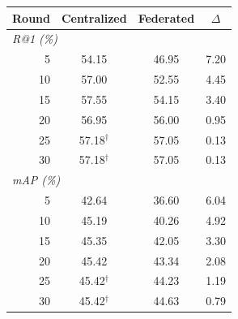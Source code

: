 \begin{tabular}{r cc c}
\toprule
Round & Centralized & Federated & $\Delta$\\
\midrule
\multicolumn{4}{l}{\textit{R@1 (\%)}}\\
5 & 54.15 & 46.95 & 7.20\\
10 & 57.00 & 52.55 & 4.45\\
15 & 57.55 & 54.15 & 3.40\\
20 & 56.95 & 56.00 & 0.95\\
25 & 57.18$^\dagger$ & 57.05 & 0.13\\
30 & 57.18$^\dagger$ & 57.05 & 0.13\\
\midrule
\multicolumn{4}{l}{\textit{mAP (\%)}}\\
5 & 42.64 & 36.60 & 6.04\\
10 & 45.19 & 40.26 & 4.92\\
15 & 45.35 & 42.05 & 3.30\\
20 & 45.42 & 43.34 & 2.08\\
25 & 45.42$^\dagger$ & 44.23 & 1.19\\
30 & 45.42$^\dagger$ & 44.63 & 0.79\\
\bottomrule
\end{tabular}
